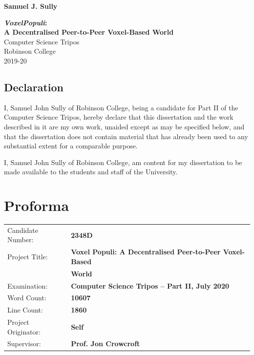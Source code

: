 \documentclass[12pt,notitlepage,a4paper]{report}
\newcommand{\voxpop}{\emph{VoxelPopuli}}
\begin{document}
	
	
	\pagestyle{empty}
	
	\hfill{\LARGE \bf Samuel J. Sully}
	
	\vspace*{60mm}
	\begin{center}
		\Huge
		{\bf \voxpop:\\ A Decentralised Peer-to-Peer Voxel-Based World} \\
		\vspace*{5mm}
		Computer Science Tripos \\
		\vspace*{5mm}
		Robinson College \\
		\vspace*{5mm}
		2019-20
	\end{center}
	
	\clearpage
	
	\setcounter{page}{1}
	\pagestyle{plain}
	
	\newpage
	\section*{Declaration}
	
	I, Samuel John Sully of Robinson College, being a candidate for Part II of the Computer
	Science Tripos, hereby declare that this dissertation and the work described in it are
	my own work, unaided except as may be specified below, and that the dissertation does
	not contain material that has already been used to any substantial extent for a comparable
	purpose.
	
	\bigskip
	
	\noindent I, Samuel John Sully of Robinson College, am content for my dissertation to be made available to the students and staff of the University.
	
	\clearpage
	
	\chapter*{Proforma}
	{
		\begin{tabular}{ll}
			Candidate Number:   & \bf 2348D\\
			Project Title:      & \bf Voxel Populi: A Decentralised Peer-to-Peer Voxel-Based\\ 
			& \bf World\\
			Examination:        & \bf Computer Science Tripos -- Part II, July 2020\\
			Word Count:         & \bf 10607\footnotemark[1]\\
			Line Count:         & \bf 1860\footnotemark[2]\\
			Project Originator: & \bf Self\\
			Supervisor:         & \bf Prof. Jon Crowcroft\\
		\end{tabular}
	}
	
\end{document}
